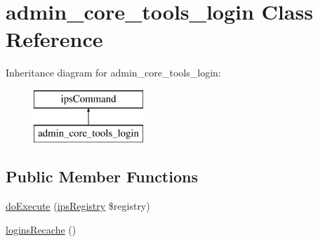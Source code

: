\hypertarget{classadmin__core__tools__login}{\section{admin\-\_\-core\-\_\-tools\-\_\-login Class Reference}
\label{classadmin__core__tools__login}
}
Inheritance diagram for admin\-\_\-core\-\_\-tools\-\_\-login\-:\begin{figure}[H]
\begin{center}
\leavevmode
\includegraphics[height=2.000000cm]{classadmin__core__tools__login}
\end{center}
\end{figure}
\subsection*{Public Member Functions}
\begin{DoxyCompactItemize}
\item 
\hyperlink{classadmin__core__tools__login_afbc4e912a0604b94d47d66744c64d8ba}{do\-Execute} (\hyperlink{classips_registry}{ips\-Registry} \$registry)
\item 
\hyperlink{classadmin__core__tools__login_a51cb76480579105eff4c33ac9024c342}{logins\-Recache} ()
\end{DoxyCompactItemize}
